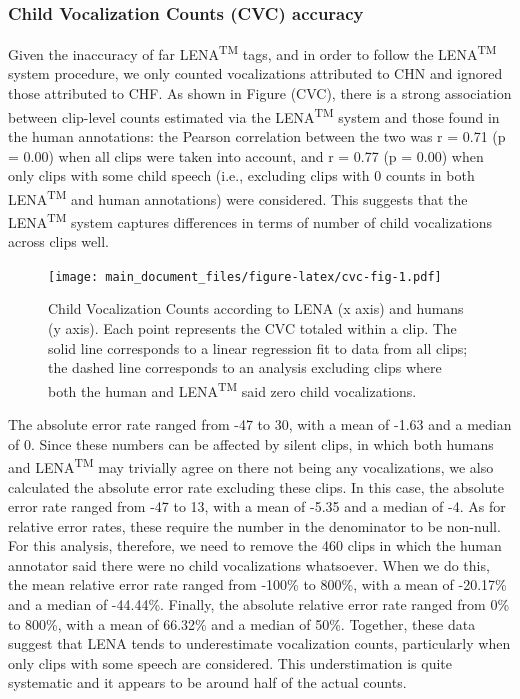 \documentclass[english,floatsintext,man]{apa6}
\begin{document}
\subsubsection{Child Vocalization Counts (CVC)
accuracy}\label{child-vocalization-counts-cvc-accuracy}

Given the inaccuracy of far LENA\textsuperscript{TM} tags, and in order
to follow the LENA\textsuperscript{TM} system procedure, we only counted
vocalizations attributed to CHN and ignored those attributed to CHF. As
shown in Figure (CVC), there is a strong association between clip-level
counts estimated via the LENA\textsuperscript{TM} system and those found
in the human annotations: the Pearson correlation between the two was r
= 0.71 (p = 0.00) when all clips were taken into account, and r = 0.77
(p = 0.00) when only clips with some child speech (i.e., excluding clips
with 0 counts in both LENA\textsuperscript{TM} and human annotations)
were considered. This suggests that the LENA\textsuperscript{TM} system
captures differences in terms of number of child vocalizations across
clips well.

\begin{figure}
\centering
\texttt{[image: main\_document\_files/figure-latex/cvc-fig-1.pdf]}
\caption{\label{fig:cvc-fig}Child Vocalization Counts according to LENA (x
axis) and humans (y axis). Each point represents the CVC totaled within
a clip. The solid line corresponds to a linear regression fit to data
from all clips; the dashed line corresponds to an analysis excluding
clips where both the human and LENA\textsuperscript{TM} said zero child
vocalizations.}
\end{figure}

The absolute error rate ranged from -47 to 30, with a mean of -1.63 and
a median of 0. Since these numbers can be affected by silent clips, in
which both humans and LENA\textsuperscript{TM} may trivially agree on
there not being any vocalizations, we also calculated the absolute error
rate excluding these clips. In this case, the absolute error rate ranged
from -47 to 13, with a mean of -5.35 and a median of -4. As for relative
error rates, these require the number in the denominator to be non-null.
For this analysis, therefore, we need to remove the 460 clips in which
the human annotator said there were no child vocalizations whatsoever.
When we do this, the mean relative error rate ranged from -100\% to
800\%, with a mean of -20.17\% and a median of -44.44\%. Finally, the
absolute relative error rate ranged from 0\% to 800\%, with a mean of
66.32\% and a median of 50\%. Together, these data suggest that LENA
tends to underestimate vocalization counts, particularly when only clips
with some speech are considered. This understimation is quite systematic
and it appears to be around half of the actual counts.
\end{document}
